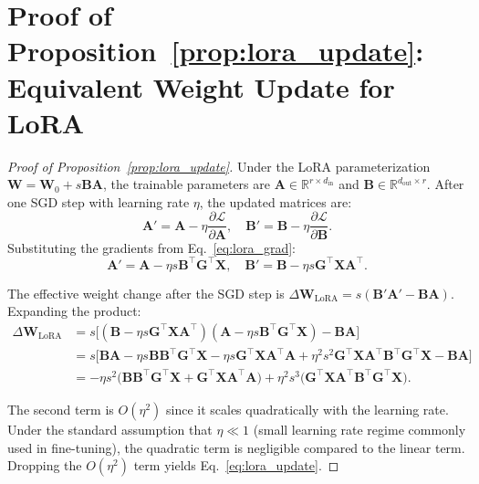 \documentclass{article}
\begin{document}
\section{Proof of Proposition~\ref{prop:lora_update}: Equivalent Weight Update for LoRA}
\label{app:prop1}

\begin{proof}[Proof of Proposition~\ref{prop:lora_update}]
Under the LoRA parameterization $\mathbf{W} = \mathbf{W}_0 + s\mathbf{B}\mathbf{A}$, the trainable parameters are $\mathbf{A} \in \mathbb{R}^{r \times d_{\text{in}}}$ and $\mathbf{B} \in \mathbb{R}^{d_{\text{out}} \times r}$. After one SGD step with learning rate $\eta$, the updated matrices are:
\begin{equation}
    \mathbf{A}' = \mathbf{A} - \eta \frac{\partial \mathcal{L}}{\partial \mathbf{A}}, \quad \mathbf{B}' = \mathbf{B} - \eta \frac{\partial \mathcal{L}}{\partial \mathbf{B}}.
\end{equation}
Substituting the gradients from Eq.~\eqref{eq:lora_grad}:
\begin{equation}
    \mathbf{A}' = \mathbf{A} - \eta s \mathbf{B}^\top \mathbf{G}^\top \mathbf{X}, \quad \mathbf{B}' = \mathbf{B} - \eta s \mathbf{G}^\top \mathbf{X}\mathbf{A}^\top.
\end{equation}

The effective weight change after the SGD step is $\Delta \mathbf{W}_{\text{LoRA}} = s(\mathbf{B}'\mathbf{A}' - \mathbf{B}\mathbf{A})$. Expanding the product:
\begin{align}
    \Delta \mathbf{W}_{\text{LoRA}}
    &= s\big[(\mathbf{B} - \eta s \mathbf{G}^\top \mathbf{X}\mathbf{A}^\top)(\mathbf{A} - \eta s \mathbf{B}^\top \mathbf{G}^\top \mathbf{X}) - \mathbf{B}\mathbf{A}\big] \nonumber\\
    &= s\big[\mathbf{B}\mathbf{A} - \eta s \mathbf{B}\mathbf{B}^\top \mathbf{G}^\top \mathbf{X} - \eta s \mathbf{G}^\top \mathbf{X}\mathbf{A}^\top \mathbf{A} + \eta^2 s^2 \mathbf{G}^\top \mathbf{X}\mathbf{A}^\top \mathbf{B}^\top \mathbf{G}^\top \mathbf{X} - \mathbf{B}\mathbf{A}\big] \nonumber\\
    &= -\eta s^2 \big(\mathbf{B}\mathbf{B}^\top \mathbf{G}^\top \mathbf{X} + \mathbf{G}^\top \mathbf{X}\mathbf{A}^\top \mathbf{A}\big) + \eta^2 s^3 \big(\mathbf{G}^\top \mathbf{X}\mathbf{A}^\top \mathbf{B}^\top \mathbf{G}^\top \mathbf{X}\big).
\end{align}

The second term is $O(\eta^2)$ since it scales quadratically with the learning rate. Under the standard assumption that $\eta \ll 1$ (small learning rate regime commonly used in fine-tuning), the quadratic term is negligible compared to the linear term. Dropping the $O(\eta^2)$ term yields Eq.~\eqref{eq:lora_update}.
\end{proof}
\end{document}
